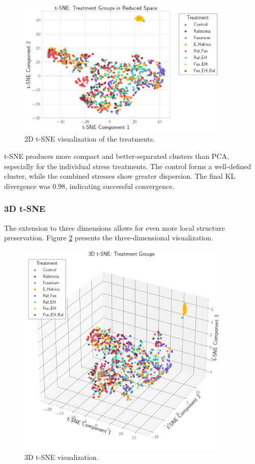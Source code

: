 \documentclass[12pt,a4paper]{article}
\begin{document}
\begin{figure}[H]
    \centering
    \includegraphics[width=0.9\textwidth]{Plots/2D_tSNE.png}
    \caption{2D t-SNE visualization of the treatments. }
    \label{fig:tsne2d}
\end{figure}

t-SNE produces more compact and better-separated clusters than PCA, especially for the individual stress treatments. The control forms a well-defined cluster, while the combined stresses show greater dispersion. The final KL divergence was 0.98, indicating successful convergence.

\subsubsection{3D t-SNE}

The extension to three dimensions allows for even more local structure preservation. Figure \ref{fig:tsne3d} presents the three-dimensional visualization.

\begin{figure}[H]
    \centering
    \includegraphics[width=0.9\textwidth]{Plots/3D_SNE.png}
    \caption{3D t-SNE visualization. }
    \label{fig:tsne3d}
\end{figure}
\end{document}
